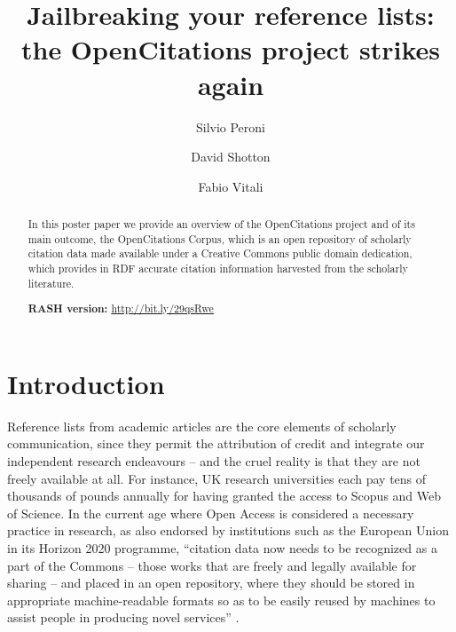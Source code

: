 \documentclass[runningheads,a4paper]{llncs}
\begin{document}
\mainmatter

\title{Jailbreaking your reference lists:\\ the OpenCitations project strikes again}
\author{Silvio Peroni \and
David Shotton \and
Fabio Vitali}
\maketitle

\begin{abstract}
In this poster paper we provide an overview of the OpenCitations project and of its main outcome, the OpenCitations Corpus, which is an open repository of scholarly citation data made available under a Creative Commons public domain dedication, which provides in RDF accurate citation information harvested from the scholarly literature.

{\bf RASH version:} \url{http://bit.ly/29qsRwe}

\end{abstract}


\section{Introduction}

Reference lists from academic articles are the core elements of scholarly communication, since they permit the attribution of credit and integrate our independent research endeavours -- and the cruel reality is that they are not freely available at all. For instance, UK research universities each pay tens of thousands of pounds annually for having granted the access to Scopus and Web of Science. In the current age where Open Access is considered a necessary practice in research, as also endorsed by institutions such as the European Union in its Horizon 2020 programme, ``citation data now needs to be recognized as a part of the Commons -- those works that are freely and legally available for sharing -- and placed in an open repository, where they should be stored in appropriate machine-readable formats so as to be easily reused by machines to assist people in producing novel services'' \cite{__RefNumPara__293_1852566440}.
\end{document}
